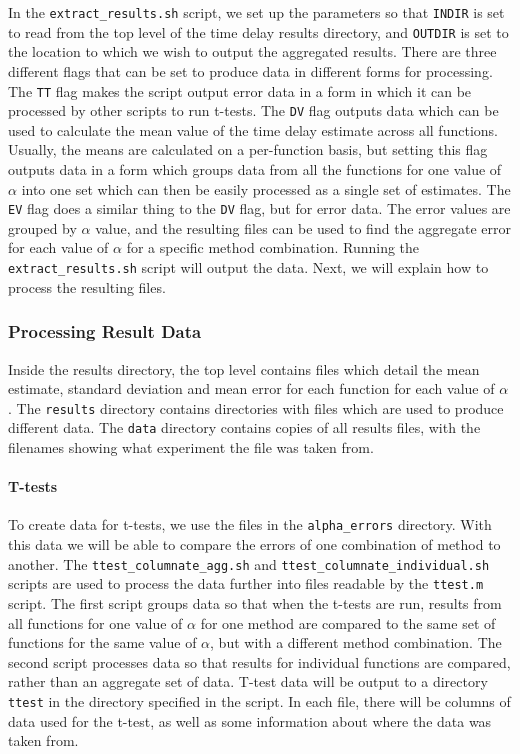 \documentclass[a4paper,11pt,twoside]{article}
\begin{document}
\begin{appendices}
    In the \texttt{extract\_results.sh} script, we set up the parameters so that
    \texttt{INDIR} is set to read from the top level of the time delay results
    directory, and \texttt{OUTDIR} is set to the location to which we wish to output
    the aggregated results. There are three different flags that can be set to
    produce data in different forms for processing. The \texttt{TT} flag makes the
    script output error data in a form in which it can be processed by other scripts
    to run t-tests. The \texttt{DV} flag outputs data which can be used to calculate
    the mean value of the time delay estimate across all functions. Usually, the
    means are calculated on a per-function basis, but setting this flag outputs data
    in a form which groups data from all the functions for one value of $\alpha$
    into one set which can then be easily processed as a single set of
    estimates. The \texttt{EV} flag does a similar thing to the \texttt{DV} flag,
    but for error data. The error values are grouped by $\alpha$ value, and the
    resulting files can be used to find the aggregate error for each value of
    $\alpha$ for a specific method combination. Running the
    \texttt{extract\_results.sh} script will output the data. Next, we will explain
    how to process the resulting files.
\subsubsection{Processing Result Data}
\label{sec-10-3-7}

    Inside the results directory, the top level contains files which detail the mean
    estimate, standard deviation and mean error for each function for each value of
    $\alpha$. The \texttt{results} directory contains directories with files which
    are used to produce different data. The \texttt{data} directory contains copies
    of all results files, with the filenames showing what experiment the file was
    taken from.

    \paragraph{T-tests}

    To create data for t-tests, we use the files in the \texttt{alpha\_errors}
    directory. With this data we will be able to compare the errors of one
    combination of method to another. The \texttt{ttest\_columnate\_agg.sh} and
    \texttt{ttest\_columnate\_individual.sh} scripts are used to process the data
    further into files readable by the \texttt{ttest.m} script. The first script
    groups data so that when the t-tests are run, results from all functions for one
    value of $\alpha$ for one method are compared to the same set of functions for
    the same value of $\alpha$, but with a different method combination. The second
    script processes data so that results for individual functions are compared,
    rather than an aggregate set of data. T-test data will be output to a directory
    \texttt{ttest} in the directory specified in the script. In each file, there
    will be columns of data used for the t-test, as well as some information about
    where the data was taken from.


\end{appendices}
\end{document}
